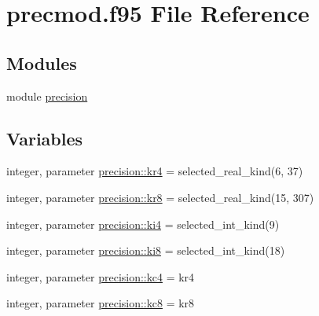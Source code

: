 \hypertarget{precmod_8f95}{}\section{precmod.\+f95 File Reference}
\label{precmod_8f95}
\subsection*{Modules}
\begin{DoxyCompactItemize}
\item 
module \hyperlink{namespaceprecision}{precision}
\end{DoxyCompactItemize}
\subsection*{Variables}
\begin{DoxyCompactItemize}
\item 
integer, parameter \hyperlink{namespaceprecision_ae184f50eb0c9c763233e9c5d34b8034a}{precision\+::kr4} = selected\+\_\+real\+\_\+kind(6, 37)
\item 
integer, parameter \hyperlink{namespaceprecision_a4b30cd5919aba1303b7b752110b57254}{precision\+::kr8} = selected\+\_\+real\+\_\+kind(15, 307)
\item 
integer, parameter \hyperlink{namespaceprecision_a7b97657c46b1524ed5f73ffc1226dc08}{precision\+::ki4} = selected\+\_\+int\+\_\+kind(9)
\item 
integer, parameter \hyperlink{namespaceprecision_a25d156062c1ee160ed75a5a6dced7ceb}{precision\+::ki8} = selected\+\_\+int\+\_\+kind(18)
\item 
integer, parameter \hyperlink{namespaceprecision_a6a58f4fab509ea84cc60d30e25bcb1ca}{precision\+::kc4} = kr4
\item 
integer, parameter \hyperlink{namespaceprecision_a2093064d9b44820731402869509b1a0d}{precision\+::kc8} = kr8
\end{DoxyCompactItemize}
